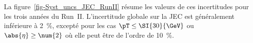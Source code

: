 La figure~\ref{fig-Syst_uncs_JEC_RunII} résume les valeurs de ces incertitudes pour les trois années du Run~II.
L'incertitude globale sur la JEC est généralement inférieure à \SI{2}{\%}, excepté pour les cas $\pT\leq\SI{30}{\GeV}$ ou $\abs{\eta}\geq\num{2}$ où elle peut être de l'ordre de \SI{10}{\%}.

